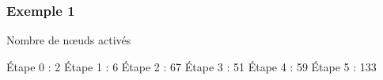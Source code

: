 \documentclass[12pt]{beamer}
\begin{document}
\begin{frame}
  \frametitle{Exemple 1}
  
  
  \begin{block}{Nombre de n\oe uds activés}
   \begin{overprint}
 Étape 0 : 2
 Étape 1 : 6
 Étape 2 : 67
 Étape 3 : 51
 Étape 4 : 59
 Étape 5 : 133
\end{overprint}
  \end{block}

  
  \begin{overlayarea}{8cm}{8cm}

\end{overlayarea}
\end{frame}
\end{document}
